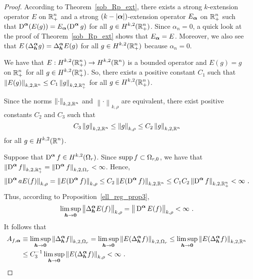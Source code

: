 \begin{proof}
According to Theorem~\ref{sob_Rp_ext}, there exists a strong
$k$-extension operator $E$ on $\displaystyle \mathbb{R}^n_+ $ and a strong
$(k-|{\bm{\alpha}}|)$-extension operator $E_{{\bm{\alpha}}}$ on
$\displaystyle \mathbb{R}^n_+$ such that
$\displaystyle \operatorname{D}^{{\bm{\alpha}}} (E(g)) =
E_{{\bm{\alpha}}}(\operatorname{D}^{{\bm{\alpha}}} g)$
for all $\displaystyle g \in H^{k,2}(\mathbb{R}^n_+)$.
Since $\alpha_n=0$, a quick look at the proof of
Theorem~\ref{sob_Rp_ext} shows that $E_{{\bm{\alpha}}} = E$.
Moreover, we also see that
$\displaystyle E\left( \Delta^{{\bm{\alpha}}}_{{\bm{h}}} g\right) =
\Delta^{{\bm{\alpha}}}_{{\bm{h}}} E(g)$
for all $\displaystyle g \in H^{k,2}(\mathbb{R}^n_+)$ because $\alpha_n=0$.

We have that $\displaystyle E:H^{k,2}(\mathbb{R}^n_+) \to H^{k,2}(\mathbb{R}^n)$ is a
bounded operator and $E(g) = g$ on $\displaystyle \mathbb{R}^n_+$ for all
$\displaystyle g \in H^{k,2}(\mathbb{R}^n_+)$.  So, there exists a
positive constant $C_1$ such that
$\displaystyle \left\| E(g) \right\|_{k,2,\mathbb{R}^n} \leq C_1
\left\| g \right\|_{k,2,\mathbb{R}^n_+}$ for all $\displaystyle g \in H^{k,2}(\mathbb{R}^n_+)$.

Since the norms $\displaystyle \left\|\cdot\right\|_{k,2,\mathbb{R}^n}$ and 
$\displaystyle \left\|\cdot\right\|_{k,\rho}$ are equivalent, there
exist positive constants $C_2$ and $C_3$ such that
\[
C_3 \left\|g \right\|_{k,2,\mathbb{R}^n} \leq \left\|g \right\|_{k,\rho}
\leq C_2 \left\|g \right\|_{k,2,\mathbb{R}^n}
\]
for all $\displaystyle g \in H^{k,2}(\mathbb{R}^n)$.

 Suppose that $\displaystyle \operatorname{D}^{{\bm{\alpha}}} f
\in H^{k,2}(\Omega_r)$.
Since $\operatorname{supp} f \subset \Omega_{r,0}$, we have that\\
$\displaystyle \left\|\operatorname{D}^{{\bm{\alpha}}} f\right\|_{k,2,\mathbb{R}^n_+}
= \displaystyle \left\|\operatorname{D}^{{\bm{\alpha}}} f \right\|_{k,2,\Omega_r} < \infty$.
Hence,
\[
\left\| \diff^{\VEC{\alpha}}a E(f) \right\|_{k,\rho} 
= \left\| E(\diff^{\VEC{\alpha}} f)\right\|_{k,\rho}
\leq C_2 \left\| E(\diff^{\VEC{\alpha}} f)\right\|_{k,2,\RR^n} \leq C_1 C_2
\left\| \diff^{\VEC{\alpha}} f\right\|_{k,2,\RR^n_+} < \infty \ .
\]
Thus, according to Proposition~\ref{ell_reg_prop3},
\[
\limsup_{{\bm{h}}\rightarrow {\bm{0}}} \big\|\Delta^{{\bm{\alpha}}}_{{\bm{h}}} E(f)
\big\|_{k,\rho} = \big\|\operatorname{D}^{{\bm{\alpha}}} E(f)\big\|_{k,\rho} < \infty \ .
\]
It follows that
\begin{align*}
A_{f,{\bm{\alpha}}} &\equiv \limsup_{{\bm{h}}\rightarrow {\bm{0}}}
\left\|\Delta^{{\bm{\alpha}}}_{{\bm{h}}} f\right\|_{k,2,\Omega_r}
= \limsup_{{\bm{h}}\rightarrow {\bm{0}}}
\left\| E(\Delta^{{\bm{\alpha}}}_{{\bm{h}}} f)\right \|_{k,2,\Omega_r}
\leq \limsup_{{\bm{h}}\rightarrow {\bm{0}}}
\left\| E(\Delta^{{\bm{\alpha}}}_{{\bm{h}}} f)\right \|_{k,2,\mathbb{R}^n} \\
&\leq C_3^{-1} \limsup_{{\bm{h}}\rightarrow {\bm{0}}}
\left\| E(\Delta^{{\bm{\alpha}}}_{{\bm{h}}} f)\right \|_{k,\rho}
< \infty \ .
\end{align*}


\end{proof}
